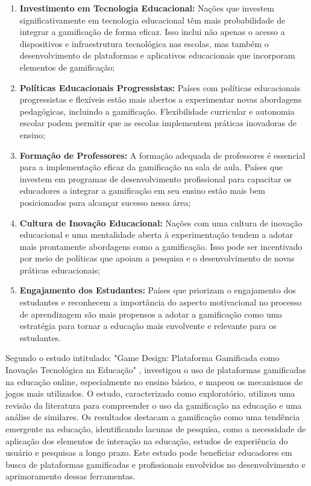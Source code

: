 \begin{enumerate}
    \item \textbf{Investimento em Tecnologia Educacional:} Nações que investem significativamente em tecnologia educacional têm mais probabilidade de integrar a gamificação de forma eficaz. Isso inclui não apenas o acesso a dispositivos e infraestrutura tecnológica nas escolas, mas também o desenvolvimento de plataformas e aplicativos educacionais que incorporam elementos de gamificação;
\\
    \item \textbf{Políticas Educacionais Progressistas:} Países com políticas educacionais progressistas e flexíveis estão mais abertos a experimentar novas abordagens pedagógicas, incluindo a gamificação. Flexibilidade curricular e autonomia escolar podem permitir que as escolas implementem práticas inovadoras de ensino;
\\
    \item \textbf{Formação de Professores:} A formação adequada de professores é essencial para a implementação eficaz da gamificação na sala de aula. Países que investem em programas de desenvolvimento profissional para capacitar os educadores a integrar a gamificação em seu ensino estão mais bem posicionados para alcançar sucesso nessa área;
\\
    \item \textbf{Cultura de Inovação Educacional:} Nações com uma cultura de inovação educacional e uma mentalidade aberta à experimentação tendem a adotar mais prontamente abordagens como a gamificação. Isso pode ser incentivado por meio de políticas que apoiam a pesquisa e o desenvolvimento de novas práticas educacionais;  
\\
    \item \textbf{Engajamento dos Estudantes:} Países que priorizam o engajamento dos estudantes e reconhecem a importância do aspecto motivacional no processo de aprendizagem são mais propensos a adotar a gamificação como uma estratégia para tornar a educação mais envolvente e relevante para os estudantes.
\\
\end{enumerate}

Segundo o estudo intitulado: "Game Design: Plataforma Gamificada como Inovação Tecnológica na Educação" \cite{de2022game}, investigou o uso de plataformas gamificadas na educação online, especialmente no ensino básico, e mapeou os mecanismos de jogos mais utilizados. O estudo, caracterizado como exploratório, utilizou uma revisão da literatura para compreender o uso da gamificação na educação e uma análise de similares. Os resultados destacam a gamificação como uma tendência emergente na educação, identificando lacunas de pesquisa, como a necessidade de aplicação dos elementos de interação na educação, estudos de experiência do usuário e pesquisas a longo prazo. Este estudo pode beneficiar educadores em busca de plataformas gamificadas e profissionais envolvidos no desenvolvimento e aprimoramento dessas ferramentas.  
\\

